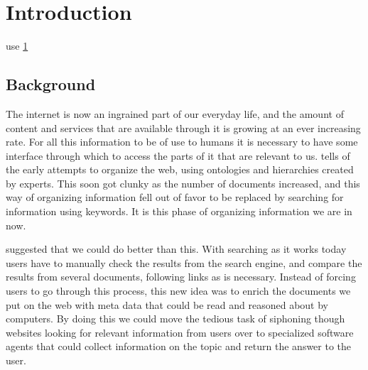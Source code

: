 
\chapter{Introduction} %

\label{Introduction} %
use \ref{Introduction}



\section{Background}
The internet is now an ingrained part of our everyday life, 
and the amount of content and services that are available through it is growing at an ever increasing rate. 
For all this information to be of use to humans it is necessary to have some interface through which to access the parts of it that are relevant to us. 
\citet{Shirky2007} tells of the early attempts to organize the web, 
using ontologies and hierarchies created by experts. 
This soon got clunky as the number of documents increased, 
and this way of organizing information fell out of favor to be replaced by searching for information using keywords. 
It is this phase of organizing information we are in now. 

\citet{Berners-Lee2001} suggested that we could do better than this. 
With searching as it works today users have to manually check the results from the search engine, 
and compare the results from several documents, following links as is necessary. 
Instead of forcing users to go through this process, 
this new idea was to enrich the documents we put on the web with meta data that could be read and reasoned about by computers. 
By doing this we could move the tedious task of siphoning though websites looking for relevant information from users 
over to specialized software agents that could collect information on the topic and return the answer to the user.


